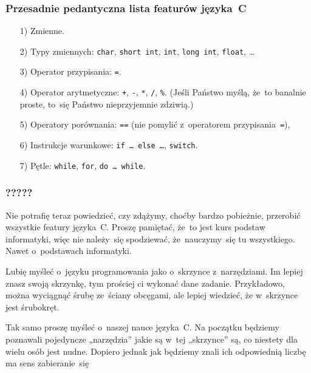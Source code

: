 \documentclass[10pt,t]{beamer}
\begin{document}
\begin{frame}
  \frametitle{Przesadnie pedantyczna lista featurów języka~C}


  \begin{itemize}

  \item[1)] Zmienne.

  \item[2)] Typy zmiennych: \texttt{char}, \texttt{short int}, \texttt{int},
    \texttt{long int}, \texttt{float}, \ldots

  \item[3)] Operator przypisania: \texttt{=}.

  \item[4)] Operator arytmetyczne: \texttt{+}, \texttt{-}, \texttt{*},
    \texttt{/}, \texttt{\%}.
    (Jeśli Państwo myślą, że~to banalnie proste, to~się Państwo
    nieprzyjemnie zdziwią.)

  \item[5)] Operatory porównania: \texttt{==} (nie pomylić z~operatorem
    przypisania~\texttt{=}),

  \item[6)] Instrukcje warunkowe: \texttt{if \ldots{} else \ldots}, \texttt{switch}.

  \item[7)] Pętle: \texttt{while}, \texttt{for}, \texttt{do \ldots{} while}.

  \end{itemize}

\end{frame}





\begin{frame}
  \frametitle{?????}


  Nie potrafię teraz powiedzieć, czy zdążymy, choćby bardzo pobieżnie,
  przerobić \alert{wszystkie} featury języka~C. Proszę pamiętać, że~to jest
  kurs \alert{podstaw informatyki}, więc nie należy~się spodziewać,
  że~nauczymy~się tu wszystkiego. Nawet o~podstawach informatyki.

  Lubię myśleć o~języku programowania jako o~skrzynce z~narzędziami.
  Im lepiej znasz swoją skrzynkę, tym prościej ci wykonać dane zadanie.
  Przykładowo, można wyciągnąć śrubę ze~ściany obcęgami, ale lepiej
  wiedzieć, że w~skrzynce jest śrubokręt.

  Tak samo proszę myśleć o~naszej nauce języka~C. Na początku będziemy
  poznawali pojedyncze „narzędzia” jakie są w~tej „skrzynce” są, co niestety
  dla wielu osób jest nudne. Dopiero jednak jak będziemy znali ich
  odpowiednią liczbę ma sens zabieranie~się

\end{frame}
\end{document}
